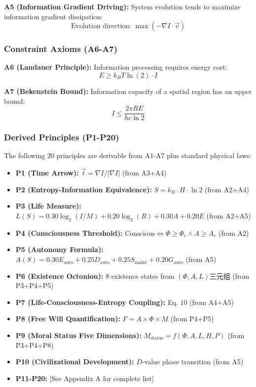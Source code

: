 \documentclass[12pt,a4paper]{article}
\begin{document}
\textbf{A5 (Information Gradient Driving):} System evolution tends to maximize information gradient dissipation:
\begin{equation}
\text{Evolution direction: } \max(-\nabla I \cdot \vec{v})
\end{equation}

\subsubsection{Constraint Axioms (A6-A7)}

\textbf{A6 (Landauer Principle):} Information processing requires energy cost:
\begin{equation}
E \geq k_B T \ln(2) \cdot I
\end{equation}

\textbf{A7 (Bekenstein Bound):} Information capacity of a spatial region has an upper bound:
\begin{equation}
I \leq \frac{2\pi R E}{\hbar c \ln 2}
\end{equation}

\subsubsection{Derived Principles (P1-P20)}

The following 20 principles are derivable from A1-A7 plus standard physical laws:

\begin{itemize}
\item \textbf{P1 (Time Arrow):} $\vec{t} = \nabla I / |\nabla I|$ (from A3+A4)
\item \textbf{P2 (Entropy-Information Equivalence):} $S = k_B \cdot H \cdot \ln 2$ (from A2+A4)
\item \textbf{P3 (Life Measure):} $L(S) = 0.30 \log_2(I/M) + 0.20 \log_2(R) + 0.30 A + 0.20 E$ (from A2+A5)
\item \textbf{P4 (Consciousness Threshold):} $\text{Conscious} \iff \Phi \geq \Phi_c \land A \geq A_c$ (from A2)
\item \textbf{P5 (Autonomy Formula):} $A(S) = 0.30 E_{\text{auto}} + 0.25 D_{\text{auto}} + 0.25 S_{\text{maint}} + 0.20 G_{\text{auto}}$ (from A5)
\item \textbf{P6 (Existence Octonion):} 8 existence states from $(\Phi, A, L)$三元组 (from P3+P4+P5)
\item \textbf{P7 (Life-Consciousness-Entropy Coupling):} Eq. 10 (from A4+A5)
\item \textbf{P8 (Free Will Quantification):} $F = A \times \Phi \times M$ (from P4+P5)
\item \textbf{P9 (Moral Status Five Dimensions):} $M_{\text{status}} = f(\Phi, A, L, H, P)$ (from P3+P4+P8)
\item \textbf{P10 (Civilizational Development):} $D$-value phase transition (from A5)
\item \textbf{P11-P20:} [See Appendix A for complete list]
\end{itemize}
\end{document}
